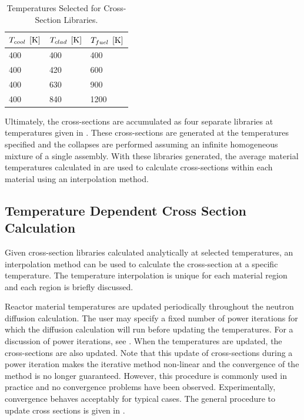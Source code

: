     \begin{table}
      \caption{Temperatures Selected for Cross-Section Libraries.}
      \label{tab:xstemps}
      \begin{center}
        \begin{tabular}{lll}
          \toprule
          $T_{cool} \;\left[\text{{K}}\right]$ & $T_{clad} \;\left[\text{{K}}\right]$ & $T_{fuel} \;\left[\text{{K}}\right]$ \\
          \midrule
          400 & 400 & 400  \\
          400 & 420 & 600  \\
          400 & 630 & 900  \\
          400 & 840 & 1200 \\
          \bottomrule
        \end{tabular}
      \end{center}
    \end{table}

    Ultimately, the cross-sections are accumulated as four separate libraries at
    temperatures given in . These cross-sections are generated
    at the temperatures specified and the collapses are performed assuming an
    infinite homogeneous mixture of a single assembly. With these libraries
    generated, the average material temperatures calculated in 
     are used to calculate cross-sections within each
    material using an interpolation method.

  \subsection{Temperature Dependent Cross Section Calculation}
    Given cross-section libraries calculated analytically at selected 
    temperatures, an interpolation method can be used to calculate the 
    cross-section at a specific temperature.  The temperature interpolation is 
    unique for each material region and each region is briefly discussed.

    Reactor material temperatures are updated periodically throughout the 
    neutron diffusion calculation. The user may specify a fixed number of power
    iterations for which the diffusion calculation will run before updating the
    temperatures.
    For a discussion of power iterations, see . When
    the temperatures are updated, the cross-sections are also updated. Note that
    this update of cross-sections during a power iteration makes the iterative
    method non-linear and the convergence of the method is no longer guaranteed.
    However, this procedure is commonly used in practice and no convergence
    problems have been observed.
    Experimentally, convergence behaves acceptably for typical cases. The
    general procedure to update cross sections is given in
    .

